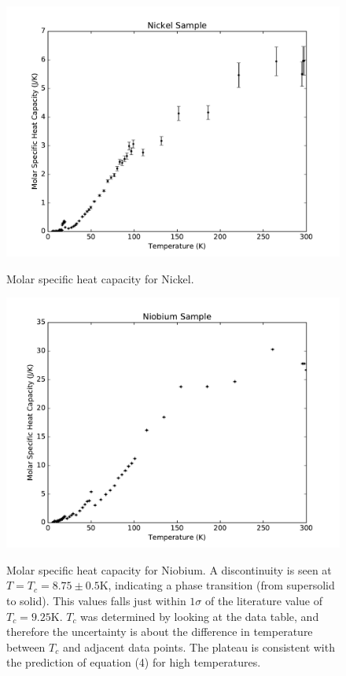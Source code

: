 \documentclass{article}
\begin{document}
\begin{figure}[!htb]
	\centering
	\includegraphics[scale=.75]{plots/Ni.pdf}
 	\label{Ni}
	\caption{Molar specific heat capacity for Nickel.}
\end{figure}

\begin{figure}[!htb]
	\centering
	\includegraphics[scale=.75]{plots/Nb.pdf}
 	\label{Nb}
	\caption{Molar specific heat capacity for Niobium. A discontinuity is seen at $T = T_c = 8.75 \pm 0.5$K, indicating a phase transition (from supersolid to solid). This values falls just within $1\sigma$ of the literature value of $T_c = 9.25$K. $T_c$ was determined by looking at the data table, and therefore the uncertainty is about the difference in temperature between $T_c$ and adjacent data points. The plateau is consistent with the prediction of equation (4) for high temperatures.}
\end{figure}
\end{document}

